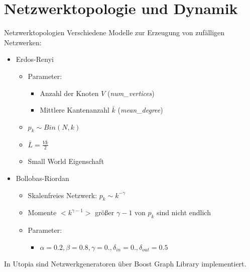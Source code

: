 \section{Netzwerktopologie und Dynamik}
\newcommand{\mdeg}{\bar{k}}
\newcommand{\vertices}{V}
\newcommand{\initrand}{\emph{init\_random\_weight}}
\newcommand{\infparamrand}{\emph{random\_infection\_parameters}}
\newcommand{\poprand}{\emph{random\_population}}
\newcommand{\medges}{\bar{L}}
\begin{frame}[t]{Netzwerktopologien} 
    Verschiedene Modelle zur Erzeugung von zufälligen Netzwerken:
    \begin{itemize}
        \item Erdos-Renyi
            \begin{itemize}
            \item Parameter:
                \begin{itemize}
                    \item Anzahl der Knoten $\vertices$ (\emph{num\_vertices})
                    \item Mittlere Kantenanzahl $\mdeg$ (\emph{mean\_degree})
                \end{itemize}
            \item $p_k \sim Bin(N, k)$
            \item $\medges = \frac{\vertices \mdeg}{2}$
            \item Small World Eigenschaft
        \end{itemize}
        \item Bollobas-Riordan
            \begin{itemize}
                \item Skalenfreies Netzwerk: $p_k \sim k^{-\gamma}$
                \item Momente $<k^{\gamma -1}>$ größer $\gamma - 1$ von $p_k$ sind nicht endlich
                \item Parameter:
                    \begin{itemize}
                        \item $\alpha = 0.2, \beta=0.8, \gamma = 0., \delta_{in} = 0.,
                            \delta_{out} = 0.5$
                    \end{itemize}
            \end{itemize}
    \end{itemize}
    In Utopia sind Netzwerkgeneratoren über Boost Graph Library implementiert.
\end{frame}
